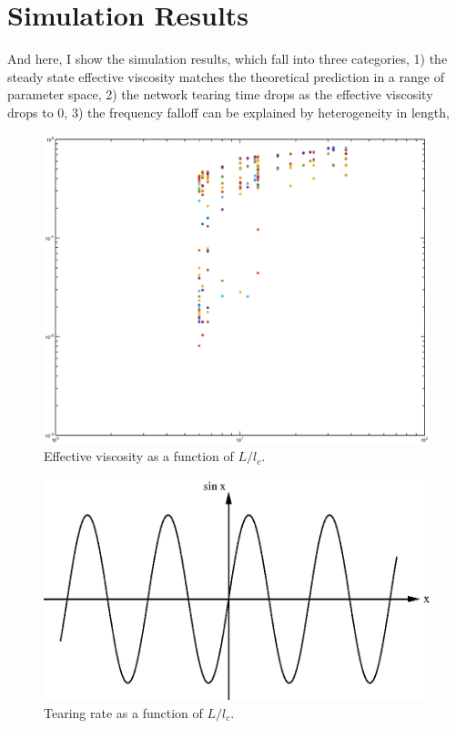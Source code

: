 \documentclass[prb,11pt]{revtex4-1}
\begin{document}
\section{Simulation Results}

And here, I show the simulation results, which fall into three categories, 1) the steady state effective viscosity matches the theoretical prediction in a range of parameter space, 2) the network tearing time drops as the effective viscosity drops to 0, 3) the frequency falloff can be explained by heterogeneity in length, 

\begin{figure}[h!]
\centering
\includegraphics[width=\textwidth]{eff_vic}
\caption{\label{fig:effvic}Effective viscosity as a function of $L/l_c$.}
\end{figure}

\begin{figure}[h!]
\centering
\includegraphics[scale=0.6]{sine}
\caption{\label{fig:tear}Tearing rate as a function of $L/l_c$.}
\end{figure}
\end{document}
